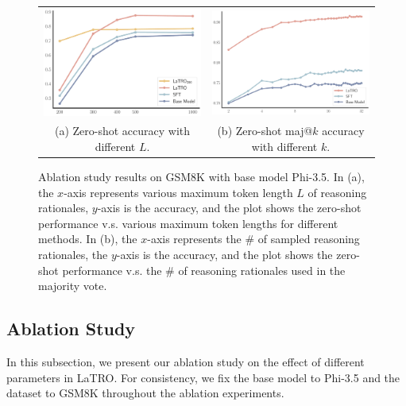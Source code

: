 \begin{figure}[t]
    \centering
     \begin{tabular}{cc}
     \includegraphics[width=.47\linewidth]{figures/ablation_study_token_length.pdf} &
     \includegraphics[width=.47\linewidth]{figures/self_consistency.pdf} \\
     \small{(a) Zero-shot accuracy with different $L$.} & \small{(b) Zero-shot maj@$k$ accuracy with different $k$.}
     \end{tabular}
    \caption{Ablation study results on GSM8K with base model Phi-3.5. In (a), the $x$-axis represents various maximum token length $L$ of reasoning rationales, $y$-axis is the accuracy, and the plot shows the zero-shot performance v.s. various maximum token lengths for different methods. In (b), the $x$-axis represents the \# of sampled reasoning rationales, the $y$-axis is the accuracy, and the plot shows the zero-shot performance v.s. the  \# of reasoning rationales used in the majority vote.}
    \label{fig:ablation}
\end{figure}



\subsection{Ablation Study}
\label{sec:ablation}

In this subsection, we present our ablation study on the effect of different parameters in LaTRO. For consistency, we fix the base model to Phi-3.5 and the dataset to GSM8K throughout the ablation experiments.

